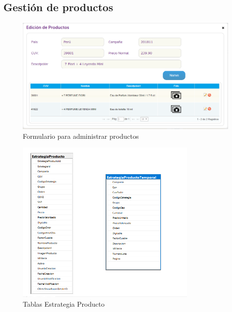 \documentclass[a4paper,11pt]{paper}
\begin{document}





\newpage
\subsection{Gestión de productos}

\begin{figure}[h]
\centering
\includegraphics[width=1.0\textwidth]{imgs/Producto/FormularioGestionProductos.png}
\caption{Formulario para administrar productos}
\end{figure}

\newpage
\begin{figure}[h!]
\centering
\includegraphics[width=0.8\textwidth]{imgs/Producto/Tablas.png}
\caption{Tablas Estrategia Producto}
\end{figure}
\end{document}
